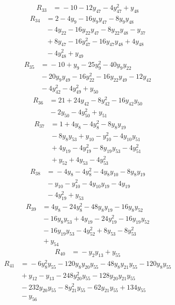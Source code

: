 \begin{align*}
R_{33} &={} -10 -12y_{47} -4y_{47}^{2} +y_{48}
\end{align*}
\begin{align*}
R_{34} &={} 2 -4y_{9} -16y_{9}y_{47} -8y_{9}y_{48} \\
 &{} -4y_{22} -16y_{22}y_{47} -8y_{22}y_{48} -y_{37} \\
 &{} +8y_{47} -16y_{47}^{2} -16y_{47}y_{48} +4y_{48} \\
 &{} -4y_{48}^{2} +y_{49}
\end{align*}
\begin{align*}
R_{35} &={} -10 +y_{9} -25y_{9}^{2} -40y_{9}y_{22} \\
 &{} -20y_{9}y_{49} -16y_{22}^{2} -16y_{22}y_{49} -12y_{42} \\
 &{} -4y_{42}^{2} -4y_{49}^{2} +y_{50}
\end{align*}
\begin{align*}
R_{36} &={} 21 +24y_{42} -8y_{42}^{2} -16y_{42}y_{50} \\
 &{} -2y_{50} -4y_{50}^{2} +y_{51}
\end{align*}
\begin{align*}
R_{37} &={} 1 +4y_{8} -4y_{8}^{2} -8y_{8}y_{19} \\
 &{} -8y_{8}y_{53} +y_{10} -y_{10}^{2} -4y_{10}y_{51} \\
 &{} +4y_{19} -4y_{19}^{2} -8y_{19}y_{53} -4y_{51}^{2} \\
 &{} +y_{52} +4y_{53} -4y_{53}^{2}
\end{align*}
\begin{align*}
R_{38} &={} -4y_{8} -4y_{8}^{2} -4y_{8}y_{10} -8y_{8}y_{19} \\
 &{} -y_{10} -y_{10}^{2} -4y_{10}y_{19} -4y_{19} \\
 &{} -4y_{19}^{2} +y_{53}
\end{align*}
\begin{align*}
R_{39} &={} 4y_{8} -24y_{8}^{2} -48y_{8}y_{19} -16y_{8}y_{52} \\
 &{} -16y_{8}y_{53} +4y_{19} -24y_{19}^{2} -16y_{19}y_{52} \\
 &{} -16y_{19}y_{53} -4y_{52}^{2} +8y_{53} -8y_{53}^{2} \\
 &{} +y_{54}
\end{align*}
\begin{align*}
R_{40} &={} -y_{2}y_{13} +y_{55}
\end{align*}
\begin{align*}
R_{41} &={} -6y_{8}^{2}y_{55} -120y_{8}y_{20}y_{55} -48y_{8}y_{21}y_{55} -120y_{8}y_{55} \\
 &{} +y_{12} -y_{13} -248y_{20}^{2}y_{55} -128y_{20}y_{21}y_{55} \\
 &{} -232y_{20}y_{55} -8y_{21}^{2}y_{55} -62y_{21}y_{55} +134y_{55} \\
 &{} -y_{56}
\end{align*}

